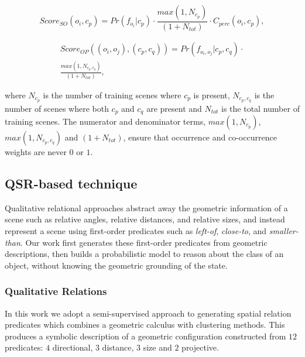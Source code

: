 \documentclass[letterpaper]{article}
\begin{document}
\begin{equation}
Score_{SO}(o_{i}, c_{p}) = Pr(f_{o_{i}}|c_{p})  \cdot \frac{max(1, N_{c_{p}})}{(1 + N_{tot})} \cdot C_{perc}(o_{i}, c_{p}),
\label{eq:scoreSO}
\end{equation}

\begin{multline}
Score_{OP}((o_{i}, o_{j}), (c_{p}, c_{q})) = Pr(f_{o_{i},o_{j}}|c_{p}, c_{q})  \cdot \\ \frac{max(1, N_{c_{p}, c_{q}})}{(1 + N_{tot})},
\end{multline}

\noindent where $N_{c_{p}}$ is the number of training scenes where $c_{p}$ is present, $N_{c_{p}, c_{q}}$ is the number of scenes where both $c_{p}$ and $c_{q}$ are present and $N_{tot}$ is the total number of training scenes. The numerator and denominator terms, $max(1, N_{c_{p}})$, $max(1, N_{c_{p}, c_{q}})$ and $(1 + N_{tot})$, ensure that occurrence and co-occurrence weights are never $0$ or $1$.


\subsection{QSR-based technique}\label{sec:qsr}

Qualitative relational approaches abstract away the geometric information of a scene such as relative angles, relative distances, and relative sizes, and instead represent a scene using first-order predicates such as \emph{left-of}, \emph{close-to}, and \emph{smaller-than}. Our work first generates these first-order predicates from geometric descriptions, then builds a probabilistic model to reason about the class of an object, without knowing the geometric grounding of the state.

\subsubsection{Qualitative Relations}

In this work we adopt a semi-supervised approach to generating spatial relation predicates which combines a geometric calculus with clustering methods. This produces a symbolic description of a geometric configuration constructed from $12$ predicates: $4$ directional, $3$ distance, $3$ size and $2$ projective.
\end{document}
